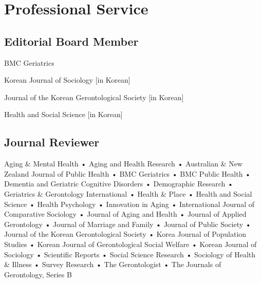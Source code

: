 \section{Professional Service}

\subsection{Editorial Board Member}

\begin{aka}
    \item [2024--\textnormal{Present}] BMC Geriatrics
    \item [2024--\textnormal{Present}] Korean Journal of Sociology [in Korean]
    \item [2023--2024] Journal of the Korean Gerontological Society [in Korean]
    \item [2023--2024] Health and Social Science [in Korean]

\end{aka}

\subsection{Journal Reviewer}

\begin{aka}

    \item []     Aging \& Mental Health • Aging and Health Research • Australian \& New Zealand Journal of Public Health • BMC Geriatrics • BMC Public Health • Dementia and Geriatric Cognitive Disorders • Demographic Research • Geriatrics \& Gerontology International • Health \& Place • Health and Social Science • Health Psychology • Innovation in Aging • International Journal of Comparative Sociology • Journal of Aging and Health • Journal of Applied Gerontology • Journal of Marriage and Family • Journal of Public Society • Journal of the Korean Gerontological Society • Korea Journal of Population Studies • Korean Journal of Gerontological Social Welfare • Korean Journal of Sociology • Scientific Reports • Social Science Research • Sociology of Health \& Illness • Survey Research • The Gerontologist • The Journals of Gerontology, Series B

\end{aka}
